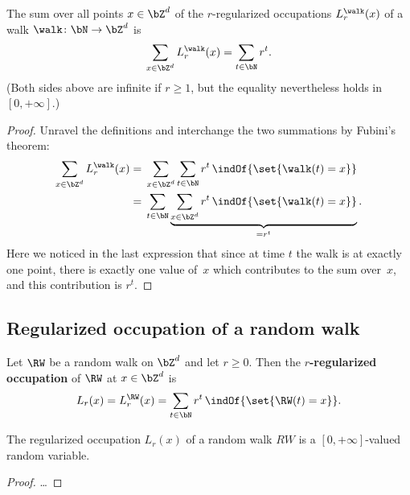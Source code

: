 \begin{lemma}
  \label{lem:sum_walk_regOcc_eq_geom_ser}
  \leanok
  The sum over all points $x \in \bZ^d$ of the $r$-regularized
  occupations $L^{\walk}_r(x)$ of a walk $\walk \colon \bN \to \bZ^d$ is
  \begin{align*}
    \sum_{x \in \bZ^d} L^{\walk}_r(x) = \sum_{t \in \bN} r^t .
  \end{align*}
  (Both sides above are infinite if $r \ge 1$, but the equality
  nevertheless holds in $[0,+\infty]$.)
\end{lemma}
\begin{proof}
  \leanok
  Unravel the definitions and interchange the two summations by Fubini's theorem:
  \begin{align*}
    \sum_{x \in \bZ^d} L^{\walk}_r(x)
    = & \; \sum_{x \in \bZ^d} \sum_{t \in \bN} r^t \, \indOf{\set{\walk(t) = x}}                      \\
    = & \; \sum_{t \in \bN} \underbrace{\sum_{x \in \bZ^d} r^t \, \indOf{\set{\walk(t) = x}}}_{=r^t}.
  \end{align*}
  Here we noticed in the last expression that since at time $t$ the walk is
  at exactly one point, there is exactly one value of~$x$ which contributes
  to the sum over~$x$, and this contribution is $r^t$.
\end{proof}


\subsection*{Regularized occupation of a random walk}

\begin{definition}
  \label{def:regularized occupation}
  \leanok
  Let $\RW$ be a random walk on $\bZ^d$ and let $r \ge 0$.
  Then the \textbf{$r$-regularized occupation}
  of $\RW$ at $x \in \bZ^d$ is
  \begin{align}\label{eq: reg occupation}
    L_r(x) = L^{\RW}_r(x) = \sum_{t \in \bN} r^t \, \indOf{\set{\RW(t) = x}} .
  \end{align}
\end{definition}

\begin{lemma}
  \label{lem:regularized occupation_mble}
  \leanok
  The regularized occupation $L_r(x)$ of a random walk $RW$
  is a $[0,+\infty]$-valued random variable.
\end{lemma}
\begin{proof}
  \leanok
  \ldots
\end{proof}

